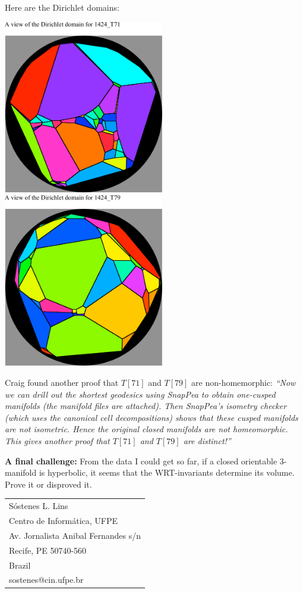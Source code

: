 \noindent
Here are the Dirichlet domains:
\begin{center}
\includegraphics[width=7cm]{1.figs/DirDomT71.pdf}
\includegraphics[width=7cm]{1.figs/DirDomT79.pdf}
\end{center}

\noindent
Craig found another proof that $T[71]$ and $T[79]$ are non-homemorphic:
{\em
``Now we can drill out the shortest geodesics using SnapPea to obtain
one-cusped manifolds (the manifold files are attached).
Then SnapPea's isometry checker (which uses the canonical cell decompositions) 
shows that these cusped manifolds are not isometric. Hence the original
closed manifolds are not homeomorphic.
This gives another proof that  $T[71]$ and $T[79]$ are distinct!''}

\noindent
{\bf A final challenge:} 
From the data I could get so far, if a closed orientable 3-manifold is hyperbolic, 
it seems that the WRT-invariants determine its volume. 
Prove it or disproved it.


%
%

%


\vspace{5mm}
\begin{center}
\hspace{7mm}
\begin{tabular}{l}
   S\'ostenes L. Lins\\
   Centro de Inform\'atica, UFPE \\
   Av. Jornalista Anibal Fernandes s/n\\
   Recife, PE 50740-560 \\
   Brazil\\
   sostenes@cin.ufpe.br
\end{tabular}
\end{center}
